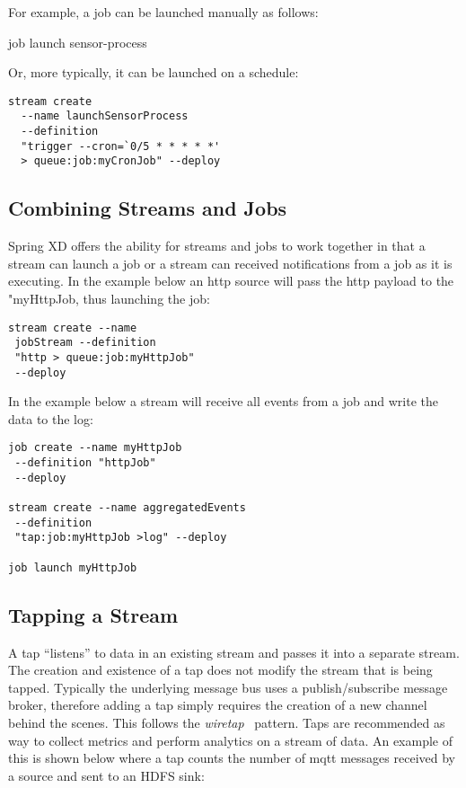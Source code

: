 For example, a job can be launched manually as follows:

job launch sensor-process

Or, more typically, it can be launched on a schedule:

\begin{lstlisting}
stream create 
  --name launchSensorProcess
  --definition 
  "trigger --cron=`0/5 * * * * *'
  > queue:job:myCronJob" --deploy
\end{lstlisting}

\subsection {Combining Streams and Jobs}

Spring XD offers the ability for streams and jobs to work together in that
a stream can launch a job or a stream can received notifications from a job
as it is executing.  In the example below an http source will pass the http
payload to the "myHttpJob, thus launching the job:

\begin{lstlisting}
stream create --name 
 jobStream --definition 
 "http > queue:job:myHttpJob"
 --deploy
\end{lstlisting}

In the example below a stream will receive all events from a job and write
the data to the log:

\begin{lstlisting}
job create --name myHttpJob
 --definition "httpJob"
 --deploy

stream create --name aggregatedEvents
 --definition
 "tap:job:myHttpJob >log" --deploy

job launch myHttpJob
\end{lstlisting}

\subsection {Tapping a Stream} \label{sssec:deploytap}

A tap ``listens'' to data in an existing stream and passes it into a separate
stream. The creation and existence of a tap does not modify the stream that
is being tapped. Typically the underlying message bus uses a publish/subscribe
message broker, therefore adding a tap simply requires the creation of
a new channel behind the scenes. This follows the \emph{wiretap}~\cite{wiretap}
pattern.  Taps are recommended as way to collect metrics and perform
analytics on a stream of data. An example of this is shown below where a
tap counts the number of mqtt messages received by a source and sent to an
HDFS sink:

